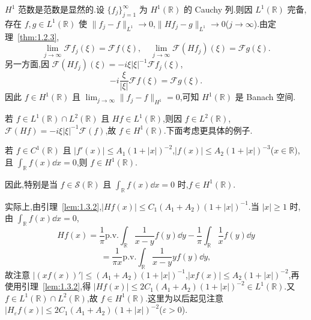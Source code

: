 $H^{1}$ 范数是范数是显然的.设 $\{f_{j}\}_{j=1}^{\infty}$ 为 $H^{1}(\mathbb{R})$ 的 Cauchy 列.则因 $L^{1}(\mathbb{R})$ 完备,存在 $f, g \in L^{1}(\mathbb{R})$ 使 $\| f_{j} - f \|_{L^{1}} \to 0$,$\| Hf_{j} - g \|_{L^{1}} \to 0$($j \to \infty$).由定理~\ref{thm:1.2.3},
\begin{equation*}
\lim_{j \to \infty}\mathcal{F}f_{j}(\xi) = \mathcal{F}f(\xi), \quad \lim_{j \to \infty}\mathcal{F}(Hf_{j})(\xi) = \mathcal{F}g(\xi).
\end{equation*}
另一方面,因 $\mathcal{F}(Hf_{j})(\xi) = -i\xi|\xi|^{-1}\mathcal{F}f_{j}(\xi)$,
\begin{equation*}
-i\frac{\xi}{|\xi|}\mathcal{F}f(\xi) = \mathcal{F}g(\xi).
\end{equation*}
因此 $f \in H^{1}(\mathbb{R})$ 且 $\lim_{j \to \infty}\| f_{j} - f \|_{H^{1}} = 0$,可知 $H^{1}(\mathbb{R})$ 是 Banach 空间.

若 $f \in L^{1}(\mathbb{R}) \cap L^{2}(\mathbb{R})$ 且 $Hf \in L^{1}(\mathbb{R})$,则因 $f \in L^{2}(\mathbb{R})$,$\mathcal{F}(Hf) = -i\xi|\xi|^{-1}\mathcal{F}(f)$,故 $f \in H^{1}(\mathbb{R})$.下面考虑更具体的例子.

\begin{example}\label{exa:1.12.2}
若 $f \in C^{1}(\mathbb{R})$ 且 $|f'(x)| \leq A_{1}(1 + |x|)^{-2}$,$|f(x)| \leq A_{2}(1 + |x|)^{-3}$($x \in \mathbb{R}$),且 $\int_{\mathbb{R}}f(x)\dd x = 0$,则 $f \in H^{1}(\mathbb{R})$.

因此,特别是当 $f \in \mathcal{S}(\mathbb{R})$ 且 $\int_{\mathbb{R}}f(x)\dd x = 0$ 时,$f \in H^{1}(\mathbb{R})$.

实际上,由引理~\ref{lem:1.3.2},$|Hf(x)| \leq C_{1}(A_{1} + A_{2})(1 + |x|)^{-1}$.当 $|x| \geq 1$ 时,由 $\int_{\mathbb{R}}f(x)\dd x = 0$,
\begin{equation*}
Hf(x) = \frac{1}{\pi}\mathrm{p.v.}\int_{\mathbb{R}}\frac{1}{x - y}f(y)\dd y - \frac{1}{\pi}\int_{\mathbb{R}}\frac{1}{x}f(y)\dd y
\end{equation*}
\begin{equation*}
= \frac{1}{\pi x}\mathrm{p.v.}\int_{\mathbb{R}}\frac{1}{x - y}yf(y)\dd y,
\end{equation*}
故注意 $|(xf(x))'| \leq (A_{1} + A_{2})(1 + |x|)^{-1}$,$|xf(x)| \leq A_{2}(1 + |x|)^{-2}$,再使用引理~\ref{lem:1.3.2},得 $|Hf(x)| \leq 2C_{1}(A_{1} + A_{2})(1 + |x|)^{-2} \in L^{1}(\mathbb{R})$.又 $f \in L^{1}(\mathbb{R}) \cap L^{2}(\mathbb{R})$,故 $f \in H^{1}(\mathbb{R})$.这里为以后起见注意 $|H_{\varepsilon}f(x)| \leq 2C_{1}(A_{1} + A_{2})(1 + |x|)^{-2}$($\varepsilon > 0$).
\end{example}

